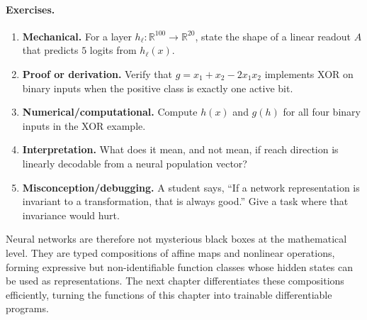 \paragraph{Exercises.}
\begin{enumerate}[label=\textbf{37.4.\arabic*.}, leftmargin=*]
\item \textbf{Mechanical.} For a layer \(h_\ell:\mathbb R^{100}\to\mathbb R^{20}\), state the shape of a linear readout \(A\) that predicts \(5\) logits from \(h_\ell(x)\).
\item \textbf{Proof or derivation.} Verify that \(g=x_1+x_2-2x_1x_2\) implements XOR on binary inputs when the positive class is exactly one active bit.
\item \textbf{Numerical/computational.} Compute \(h(x)\) and \(g(h)\) for all four binary inputs in the XOR example.
\item \textbf{Interpretation.} What does it mean, and not mean, if reach direction is linearly decodable from a neural population vector?
\item \textbf{Misconception/debugging.} A student says, ``If a network representation is invariant to a transformation, that is always good.'' Give a task where that invariance would hurt.
\end{enumerate}

Neural networks are therefore not mysterious black boxes at the mathematical level. They are typed compositions of affine maps and nonlinear operations, forming expressive but non-identifiable function classes whose hidden states can be used as representations. The next chapter differentiates these compositions efficiently, turning the functions of this chapter into trainable differentiable programs.

\clearpage
